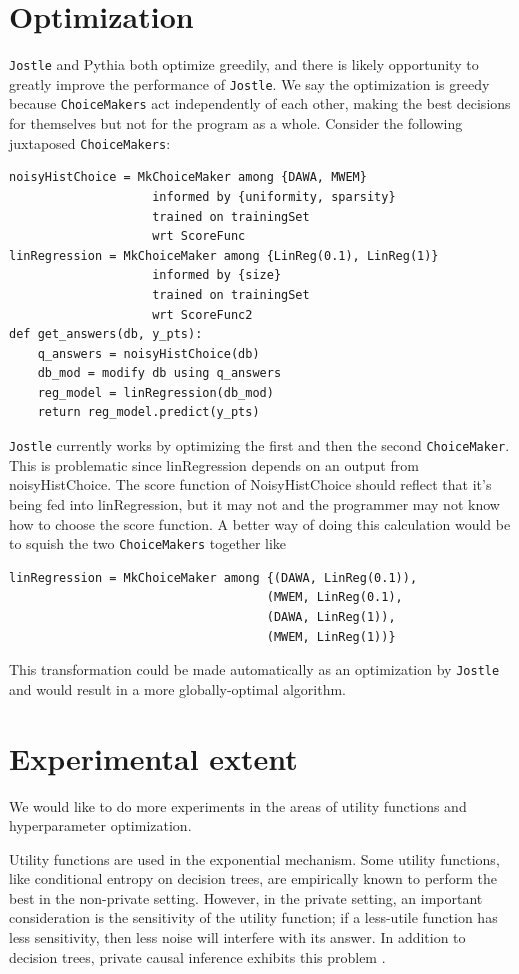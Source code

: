 \documentclass[11pt]{report}
\newcommand{\Jostle}{\texttt{Jostle}}
\renewcommand{\t}[1]{\texttt{#1}}
\begin{document}
\section{Optimization}
\Jostle{} and Pythia both optimize greedily, and there is likely opportunity to greatly improve the performance of \Jostle{}. We say the optimization is greedy because \t{ChoiceMakers} act independently of each other, making the best decisions for themselves but not for the program as a whole. Consider the following juxtaposed \t{ChoiceMakers}:
\begin{lstlisting}[style=MyPythonStyle]
noisyHistChoice = MkChoiceMaker among {DAWA, MWEM}
                    informed by {uniformity, sparsity}
                    trained on trainingSet 
                    wrt ScoreFunc
linRegression = MkChoiceMaker among {LinReg(0.1), LinReg(1)}
                    informed by {size}
                    trained on trainingSet
                    wrt ScoreFunc2
def get_answers(db, y_pts):
    q_answers = noisyHistChoice(db)
    db_mod = modify db using q_answers
    reg_model = linRegression(db_mod)
    return reg_model.predict(y_pts)
\end{lstlisting}
\Jostle{} currently works by optimizing the first and then the second \t{ChoiceMaker}. This is problematic since linRegression depends on an output from noisyHistChoice. The score function of NoisyHistChoice should reflect that it's being fed into linRegression, but it may not and the programmer may not know how to choose the score function. A better way of doing this calculation would be to squish the two \t{ChoiceMakers} together like
\begin{lstlisting}[style=MyPythonStyle]
linRegression = MkChoiceMaker among {(DAWA, LinReg(0.1)),
                                    (MWEM, LinReg(0.1),
                                    (DAWA, LinReg(1)),
                                    (MWEM, LinReg(1))}
\end{lstlisting}
This transformation could be made automatically as an optimization by \Jostle{} and would result in a more globally-optimal algorithm.
\section{Experimental extent}
We would like to do more experiments in the areas of utility functions and hyperparameter optimization. 

Utility functions are used in the exponential mechanism. Some utility functions, like conditional entropy on decision trees, are empirically known to perform the best in the non-private setting. However, in the private setting, an important consideration is the sensitivity of the utility function; if a less-utile function has less sensitivity, then less noise will interfere with its answer. In addition to decision trees, private causal inference exhibits this problem \cite{Kusner:2016}.


\end{document}
